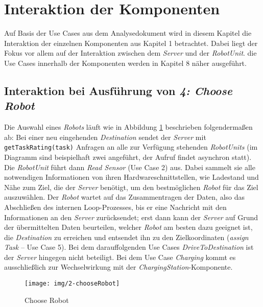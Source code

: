 \section{Interaktion der Komponenten}
Auf Basis der Use Cases aus dem Analysedokument wird in diesem Kapitel die Interaktion der einzelnen Komponenten aus Kapitel 1 betrachtet. Dabei liegt der Fokus vor allem auf der Interaktion zwischen dem \emph{Server} und der \emph{RobotUnit}. die Use Cases innerhalb der Komponenten werden in Kapitel 8 näher ausgeführt.\\


\subsection*{Interaktion bei Ausführung von \emph{4: Choose Robot}}

Die Auswahl eines \emph{Robots} läuft wie in Abbildung \ref{SequenzDiagrammInteraktion} beschrieben folgendermaßen ab: Bei einer neu eingehenden \emph{Destination} sendet der \emph{Server} mit \texttt{getTaskRating(task)} Anfragen an alle zur Verfügung stehenden \emph{RobotUnits} (im Diagramm sind beispielhaft zwei angeführt, der Aufruf findet asynchron statt). Die \emph{RobotUnit} führt dann \emph{Read Sensor} (Use Case 2) aus. Dabei sammelt sie alle notwendigen Informationen von ihren Hardwareschnittstellen, wie Ladestand und Nähe zum Ziel, die der \emph{Server} benötigt, um den bestmöglichen \emph{Robot} für das Ziel auszuwählen. Der \emph{Robot} wartet auf das Zusammentragen der Daten, also das Abschließen des internen Loop-Prozesses, bis er eine Nachricht mit den Informationen an den \emph{Server} zurücksendet; erst dann kann der \emph{Server} auf Grund der übermittelten Daten beurteilen, welcher \emph{Robot} am besten dazu geeignet ist, die \emph{Destination} zu erreichen und entsendet ihn zu den Zielkoordinaten (\emph{assign Task} – Use Case 5). Bei dem darauffolgenden Use Cases \emph{DriveToDestination} ist der \emph{Server} hingegen nicht beteiligt. Bei dem Use Case \emph{Charging} kommt es ausschließlich zur Wechselwirkung mit der \emph{ChargingStation}-Komponente.

\begin{figure}[H]
	\centering
	\texttt{[image: img/2-chooseRobot]}
	\caption{Choose Robot}
	\label{SequenzDiagrammInteraktion}
\end{figure}
